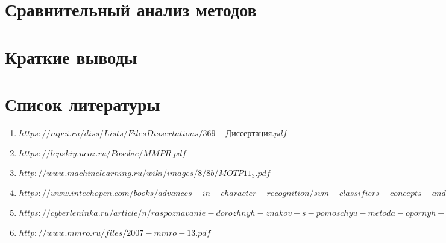 \documentclass[12pt,a4paper]{article}
\begin{document}
\section{Сравнительный анализ методов}
\section{Краткие выводы}
\section{Список литературы}
\begin{enumerate}
    \item \href{https://mpei.ru/diss/Lists/FilesDissertations/369-Диссертация.pdf}{$https://mpei.ru/diss/Lists/FilesDissertations/369-Диссертация.pdf$}
    \item \href{https://lepskiy.ucoz.ru/Posobie/MMPR_.pdf}{$https://lepskiy.ucoz.ru/Posobie/MMPR_.pdf$}
    \item \href{http://www.machinelearning.ru/wiki/images/8/8b/MOTP11_3.pdf}{$http://www.machinelearning.ru/wiki/images/8/8b/MOTP11_3.pdf$}
    \item \href{https://www.intechopen.com/books/advances-in-character-recognition/svm-classifiers-concepts-and-applications-to-character-recognition}{$https://www.intechopen.com/books/advances-in-character-recognition/svm-classifiers-concepts-and-applications-to-character-recognition$}
    \item \href{https://cyberleninka.ru/article/n/raspoznavanie-dorozhnyh-znakov-s-pomoschyu-metoda-opornyh-vektorov-i-gistogramm-orientirovannyh-gradientov}{$https://cyberleninka.ru/article/n/raspoznavanie-dorozhnyh-znakov-s-pomoschyu-metoda-opornyh-vektorov-i-gistogramm-orientirovannyh-gradientov$}
    \item \href{http://www.mmro.ru/files/2007-mmro-13.pdf}{$http://www.mmro.ru/files/2007-mmro-13.pdf$}
\end{enumerate}
\end{document}
